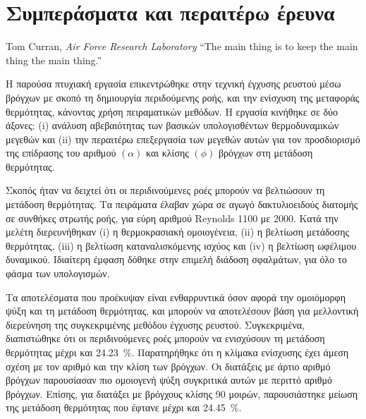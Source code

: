 \chapter{Συμπεράσματα και περαιτέρω έρευνα}\label{ch:suggestions}

\begin{chapquote}{Tom Curran, \textit{Air Force Research Laboratory}}
“The main thing is to keep the main thing the main thing.”
\end{chapquote}

\ifpdf
    \graphicspath{{Chapter6/Figs/Raster/}{Chapter6/Figs/PDF/}{Chapter5/Figs/}}
\else
    \graphicspath{{Chapter6/Figs/Vector/}{Chapter6/Figs/}}
\fi




\noindent Η παρούσα πτυχιακή εργασία επικεντρώθηκε στην τεχνική έγχυσης ρευστού μέσω βρόγχων με σκοπό τη δημιουργία περιδούμενης ροής, και την ενίσχυση της μεταφοράς θερμότητας, κάνοντας χρήση πειραματικών μεθόδων. Η εργασία κινήθηκε σε δύο άξονες: (i) ανάλυση αβεβαιότητας των βασικών υπολογισθέντων θερμοδυναμικών μεγεθών και (ii) την περαιτέρω επεξεργασία των μεγεθών αυτών για τον προσδιορισμό της επίδρασης του αριθμού $\left(\alpha\right)$ και κλίσης $\left(\phi\right)$ βρόγχων στη μετάδοση θερμότητας.

Σκοπός ήταν να δειχτεί ότι οι περιδινούμενες ροές μπορούν να βελτιώσουν τη μετάδοση θερμότητας. Τα πειράματα έλαβαν χώρα σε αγωγό δακτυλιοειδούς διατομής σε συνθήκες στρωτής ροής, για εύρη αριθμού Reynolds 1100 με 2000. Κατά την μελέτη διερευνήθηκαν (i) η θερμοκρασιακή ομοιογένεια, (ii) η βελτίωση μετάδοσης θερμότητας, (iii) η βελτίωση καταναλισκόμενης ισχύος και (iv) η βελτίωση ωφέλιμου δυναμικού. Ιδιαίτερη έμφαση δόθηκε στην επιμελή διάδοση σφαλμάτων, για όλο το φάσμα των υπολογισμών.

Τα αποτελέσματα που προέκυψαν είναι ενθαρρυντικά όσον αφορά την ομοιόμορφη ψύξη και τη μετάδοση θερμότητας, και μπορούν να αποτελέσουν βάση για μελλοντική διερεύνηση της συγκεκριμένης μεθόδου έγχυσης ρευστού. Συγκεκριμένα, διαπιστώθηκε ότι οι περιδινούμενες ροές μπορούν να ενισχύσουν τη μετάδοση θερμότητας μέχρι και \qty{24.23}{\percent}. Παρατηρήθηκε ότι η κλίμακα ενίσχυσης έχει άμεση σχέση με τον αριθμό και την κλίση των βρόγχων. Οι διατάξεις με άρτιο αριθμό βρόγχων παρουσίασαν πιο ομοιογενή ψύξη συγκριτικά αυτών με περιττό αριθμό βρόγχων. Επίσης, για διατάξει με βρόγχους κλίσης 90 μοιρών, παρουσιάστηκε μείωση της μετάδοση θερμότητας που έφτανε μέχρι και \qty{24.45}{\percent}.

